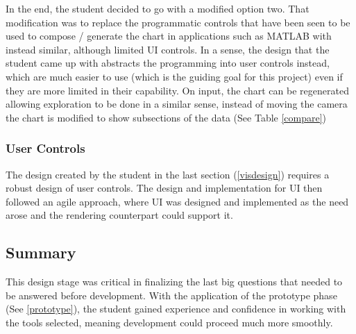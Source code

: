 In the end, the student decided to go with a modified option two. That modification was to replace the programmatic controls that have been seen to be used to compose / generate the chart in applications such as MATLAB with instead similar, although limited UI controls. In a sense, the design that the student came up with abstracts the programming into user controls instead, which are much easier to use (which is the guiding goal for this project) even if they are more limited in their capability. On input, the chart can be regenerated allowing exploration to be done in a similar sense, instead of moving the camera the chart is modified to show subsections of the data (See Table \ref{compare})

\subsubsection{User Controls}
The design created by the student in the last section (\ref{visdesign}) requires a robust design of user controls. The design and implementation for UI then followed an agile approach, where UI was designed and implemented as the need arose and the rendering counterpart could support it.

\subsection{Summary}
This design stage was critical in finalizing the last big questions that needed to be answered before development. With the application of the prototype phase (See \ref{prototype}), the student gained experience and confidence in working with the tools selected, meaning development could proceed much more smoothly.
